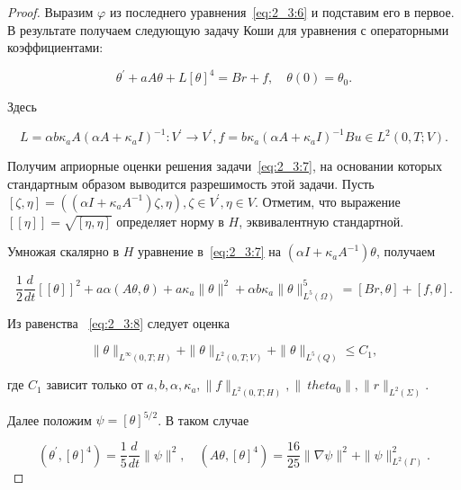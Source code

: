 \begin{proof}
    Выразим $\varphi$ из последнего уравнения~\eqref{eq:2_3:6} и подставим его в первое.
    В результате получаем следующую задачу Коши для уравнения с операторными коэффициентами:

    \begin{equation}
        \label{eq:2_3:7}
        \theta^{\prime}+a A \theta+L[\theta]^{4}=B r+f, \quad \theta(0)=\theta_{0}.
    \end{equation}

    Здесь

    \[
        L=\alpha b \kappa_{a} A\left(\alpha A+\kappa_{a} I\right)^{-1}: V^{\prime}
        \rightarrow V^{\prime}, f=b \kappa_{a}\left(\alpha A
        +\kappa_{a} I\right)^{-1} B u \in L^{2}(0, T ; V).
    \]

    Получим априорные оценки решения задачи~\eqref{eq:2_3:7},
    на основании которых стандартным образом выводится
    разрешимость этой задачи.
    Пусть $[\zeta, \eta]=\left(\left(\alpha I+\kappa_{a} A^{-1}\right) \zeta,
    \eta\right), \zeta \in V^{\prime}, \eta \in V$.
    Отметим, что выражение $[[\eta]]=\sqrt{[\eta, \eta]}$ определяет норму в $H$,
    эквивалентную стандартной.

    Умножая скалярно в $H$ уравнение в~\eqref{eq:2_3:7}
    на $\left(\alpha I+\kappa_{a} A^{-1}\right) \theta$, получаем

    \begin{equation}
        \label{eq:2_3:8}
        \frac{1}{2} \frac{d}{d t}[[\theta]]^{2}+a
        \alpha(A \theta, \theta)+a \kappa_{a}\|\theta\|^{2}+\alpha
        b \kappa_{a}\|\theta\|_{L^{5}(\Omega)}^{5}=[B r, \theta] + [f, \theta].
    \end{equation}

    Из равенства ~\eqref{eq:2_3:8} следует оценка

    \begin{equation}
        \label{eq:2_3:9}
        \|\theta\|_{L^{\infty}(0, T ; H)}+\|\theta\|_{L^{2}(0, T ; V)}
        +\|\theta\|_{L^{5}(Q)} \leq C_{1},
    \end{equation}


    где $C_{1}$ зависит только от $a, b, \alpha, \kappa_{a},\|f\|_{L^{2}(0, T ; H)},
    \left\|\ theta_{0}\right\|,\|r\|_{L^{2}(\Sigma)}$.

    Далее положим $\psi=[\theta]^{5 / 2}$.
    В таком случае

    \[
        \left(\theta^{\prime},[\theta]^{4}\right)=\frac{1}{5} \frac{d}{d t}\|\psi\|^{2},
        \quad\left(A \theta,[\theta]^{4}\right)=\frac{16}{25}\|\nabla \psi\|^{2}
        +\|\psi\|_{L^{2}(\Gamma)}^{2}.
    \]


\end{proof}
